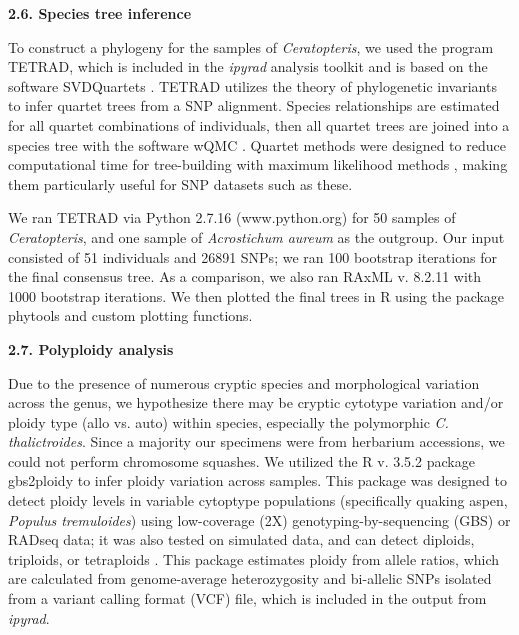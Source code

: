 \documentclass[12pt]{article}
\begin{document}
\begin{flushleft}
\textbf{2.6. Species tree inference}

To construct a phylogeny for the samples of \textit{Ceratopteris}, we used the program {\small{TETRAD}}, which is included in the \textit{ipyrad} analysis toolkit and is based on the software \small{SVDQuartets} \autocite{Chifman2015}. {\small{TETRAD}} utilizes the theory of phylogenetic invariants to infer quartet trees from a SNP alignment. Species relationships are estimated for all quartet combinations of individuals, then all quartet trees are joined into a species tree with the software {\small{wQMC}} \autocite{Avni2015}. Quartet methods were designed to reduce computational time for tree-building with maximum likelihood methods \autocite{Ranwez2001}, making them particularly useful for SNP datasets such as these.

We ran {\small{TETRAD}} via Python 2.7.16 (www.python.org) for 50 samples of \textit{Ceratopteris}, and one sample of \textit{Acrostichum aureum} as the outgroup. Our input consisted of 51 individuals and 26891 SNPs; we ran 100 bootstrap iterations for the final consensus tree. As a comparison, we also ran {\small{RAxML}} v. 8.2.11 \autocite{Stamatakis2014} with 1000 bootstrap iterations. We then plotted the final trees in R using the package phytools \autocite{Revell2012} and custom plotting functions.

\textbf{2.7. Polyploidy analysis}

Due to the presence of numerous cryptic species and morphological variation across the genus, we hypothesize there may be cryptic cytotype variation and/or ploidy type (allo vs. auto) within species, especially the polymorphic \textit{C. thalictroides}. Since a majority our specimens were from herbarium accessions, we could not perform chromosome squashes. We utilized the R v. 3.5.2 \autocite{R_352} package gbs2ploidy to infer ploidy variation across samples. This package was designed to detect ploidy levels in variable cytoptype populations (specifically quaking aspen, \textit{Populus tremuloides}) using low-coverage (2X) genotyping-by-sequencing (GBS) or RADseq data; it was also tested on simulated data, and can detect diploids, triploids, or tetraploids \autocite{Gompert2017}. This package estimates ploidy from allele ratios, which are calculated from genome-average heterozygosity and bi-allelic SNPs isolated from a variant calling format (VCF) file, which is included in the output from \textit{ipyrad}.


\end{flushleft}
\end{document}
